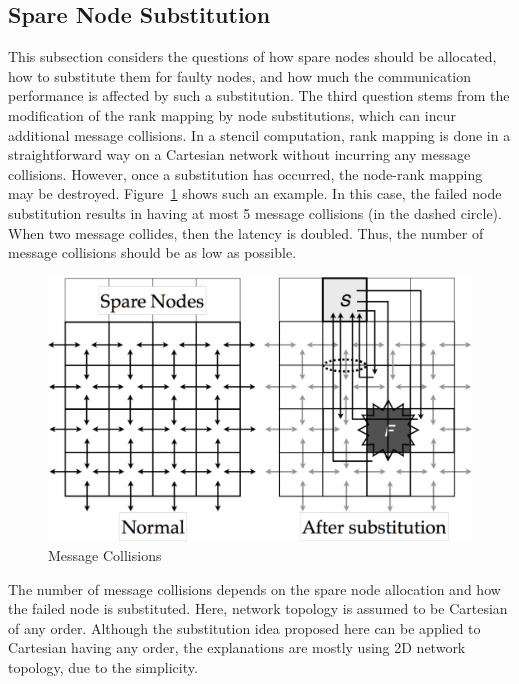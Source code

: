 \subsection{Spare Node Substitution}

This subsection considers the questions of how spare nodes should be
allocated, how to substitute them for faulty nodes, and how much the
communication performance is affected by such a substitution.
The third question stems from the modification of the rank mapping by
node substitutions, which can incur additional message collisions.
In a stencil computation, rank mapping is done in a
straightforward way on a Cartesian network without incurring any
message collisions. However, once a substitution has occurred, the
node-rank mapping may be
destroyed. Figure~\ref{fig:message-collisions} shows such an
example. In this case, the failed node substitution results in having
at most 5 message collisions (in the dashed circle). When two message
collides, then the latency is doubled. Thus, the number of message
collisions should be as low as possible.

\begin{figure}[ht]
\begin{center}
\includegraphics[width=0.6\columnwidth]{Figs/MessageCollisions.pdf}
  \caption{Message Collisions}
  \label{fig:message-collisions}
\end{center}
\end{figure}

The number of message collisions depends on the spare node allocation
and how the failed node is substituted. Here, network topology is
assumed to be Cartesian of any order. Although the substitution idea
proposed here can be applied to Cartesian having any order, the
explanations are mostly using 2D network topology, due to the
simplicity. 

